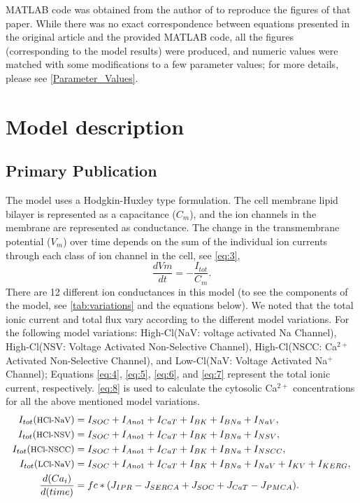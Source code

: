 \documentclass[fleqn,10pt]{physiome}
\begin{document}
MATLAB \citep{shampine1997matlab} code was obtained from the author of \citet{lees2014computational} to reproduce the figures of that paper. While there was no exact correspondence between equations presented in the original article and the provided MATLAB code, all the figures (corresponding to the model results) were produced, and numeric values were matched with some modifications to a few parameter values; for more details, please see \autoref{Parameter_Values}. 

\section{Model description}
\subsection{Primary Publication}

The model uses a Hodgkin-Huxley type formulation. The cell membrane lipid bilayer is represented as a capacitance ($C_{m}$), and the ion channels in the membrane are represented as conductance. The change in the transmembrane potential ($V_{m}$) over time depends on the sum of the individual ion currents through each class of ion channel in the cell, see \autoref{eq:3},
\begin{equation}
\frac{dVm}{dt} = - \frac{I_{tot}}{C_{m}} \label{eq:3}.    
\end{equation} 
There are 12 different ion conductances in this model (to see the components of the model, see \autoref{tab:variations} and the equations below). We noted that the total ionic current and total flux vary according to the different model variations.
For the following model variations: High-Cl(NaV: voltage activated Na Channel), High-Cl(NSV: Voltage Activated Non-Selective Channel), High-Cl(NSCC: Ca$^{2+}$ Activated Non-Selective Channel), and Low-Cl(NaV: Voltage Activated Na$^{+}$ Channel); Equations \ref{eq:4}, \ref{eq:5}, \ref{eq:6}, and \ref{eq:7} represent the total ionic current, respectively. \autoref{eq:8} is used to calculate the cytosolic Ca$^{2+}$ concentrations for all the above mentioned model variations.
\begin{align}
I_{tot}(\text{\footnotesize{HCl-NaV}}) &= I_{SOC}+I_{Ano1}+I_{CaT}+I_{BK}+I_{BNa}+I_{NaV},  \label{eq:4} \\
I_{tot}(\text{\footnotesize{HCl-NSV}}) &= I_{SOC}+I_{Ano1}+I_{CaT}+I_{BK}+I_{BNa}+I_{NSV},\label{eq:5} \\
I_{tot}(\text{\footnotesize{HCl-NSCC}}) &= I_{SOC}+I_{Ano1}+I_{CaT}+I_{BK}+I_{BNa}+I_{NSCC}, \label{eq:6} \\
I_{tot}(\text{\footnotesize{LCl-NaV}}) &= I_{SOC}+I_{Ano1}+I_{CaT}+I_{BK}+I_{BNa}+I_{NaV}+ I_{KV}+I_{KERG}, \label{eq:7}\\
\frac {d(Ca_{i})}{d(time)} &= fc*(J_{IPR}-J_{SERCA}+J_{SOC}+J_{CaT}-J_{PMCA}). \label{eq:8} 
\end{align}
\end{document}

